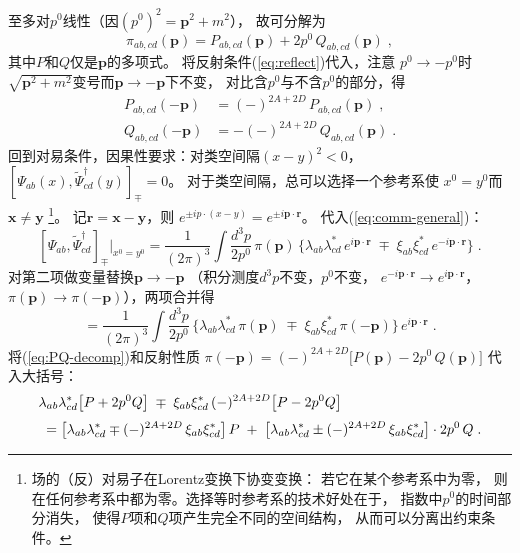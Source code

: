 至多对$p^{0}$线性（因$(p^{0})^{2}=\boldsymbol{p}^{2}+m^{2}$），
故可分解为
\begin{equation}\label{eq:PQ-decomp}
  \pi_{ab,cd}(\boldsymbol{p})
  = P_{ab,cd}(\boldsymbol{p})
  + 2p^{0}\,Q_{ab,cd}(\boldsymbol{p})\;,
\end{equation}
其中$P$和$Q$仅是$\boldsymbol{p}$的多项式。
将反射条件(\ref{eq:reflect})代入，注意
$p^{0}\to -p^{0}$时
$\sqrt{\boldsymbol{p}^{2}+m^{2}}$变号而$\boldsymbol{p}\to -\boldsymbol{p}$下不变，
对比含$p^{0}$与不含$p^{0}$的部分，得
\begin{align}
  P_{ab,cd}(-\boldsymbol{p})
  &= (-)^{2A+2D}\,P_{ab,cd}(\boldsymbol{p})\;,
  \label{eq:P-reflect}\\[2pt]
  Q_{ab,cd}(-\boldsymbol{p})
  &= -(-)^{2A+2D}\,Q_{ab,cd}(\boldsymbol{p})\;.
  \label{eq:Q-reflect}
\end{align}
回到对易条件，因果性要求：对类空间隔$(x-y)^{2}<0$，
$[\Psi_{ab}(x),\widetilde{\Psi}_{cd}^{\dagger}(y)]_{\mp}=0$。
对于类空间隔，总可以选择一个参考系使
$x^{0}=y^{0}$而$\boldsymbol{x}\neq\boldsymbol{y}$%
\footnote{场的（反）对易子在Lorentz变换下协变变换：
若它在某个参考系中为零，
则在任何参考系中都为零。选择等时参考系的技术好处在于，
指数中$p^{0}$的时间部分消失，
使得$P$项和$Q$项产生完全不同的空间结构，
从而可以分离出约束条件。}。
记$\mathbf{r}=\boldsymbol{x}-\boldsymbol{y}$，则
$e^{\pm ip\cdot(x-y)}=e^{\pm i\boldsymbol{p}\cdot\mathbf{r}}$。
代入(\ref{eq:comm-general})：
\[
  [\Psi_{ab},\widetilde{\Psi}_{cd}^{\dagger}]_{\mp}\Big|_{x^{0}=y^{0}}
  = \frac{1}{(2\pi)^{3}}\int\frac{d^{3}p}{2p^{0}}\,\pi(\boldsymbol{p})\,
    \bigl\{\lambda_{ab}\lambda_{cd}^{*}\,e^{i\boldsymbol{p}\cdot\mathbf{r}}
    \;\mp\; \xi_{ab}\xi_{cd}^{*}\,e^{-i\boldsymbol{p}\cdot\mathbf{r}}\bigr\}\;.
\]
对第二项做变量替换$\boldsymbol{p}\to -\boldsymbol{p}$
（积分测度$d^{3}p$不变，$p^{0}$不变，
$e^{-i\boldsymbol{p}\cdot\mathbf{r}}\to e^{i\boldsymbol{p}\cdot\mathbf{r}}$，
$\pi(\boldsymbol{p})\to \pi(-\boldsymbol{p})$），两项合并得
\[
  = \frac{1}{(2\pi)^{3}}\int\frac{d^{3}p}{2p^{0}}\,
    \bigl\{\lambda_{ab}\lambda_{cd}^{*}\,\pi(\boldsymbol{p})
    \;\mp\; \xi_{ab}\xi_{cd}^{*}\,\pi(-\boldsymbol{p})\bigr\}
    \,e^{i\boldsymbol{p}\cdot\mathbf{r}}\;.
\]
将(\ref{eq:PQ-decomp})和反射性质
$\pi(-\boldsymbol{p})=(-)^{2A+2D}\bigl[P(\boldsymbol{p})-2p^{0}\,Q(\boldsymbol{p})\bigr]$
代入大括号：
\begin{align}
  &\lambda_{ab}\lambda_{cd}^{*}\bigl[P+2p^{0}Q\bigr]
   \;\mp\; \xi_{ab}\xi_{cd}^{*}\,(-)^{2A+2D}
       \bigl[P-2p^{0}Q\bigr] \notag\\[3pt]
  &\;= \bigl[\lambda_{ab}\lambda_{cd}^{*}
         \mp (-)^{2A+2D}\,\xi_{ab}\xi_{cd}^{*}\bigr]\,P
    \;+\; \bigl[\lambda_{ab}\lambda_{cd}^{*}
         \pm (-)^{2A+2D}\,\xi_{ab}\xi_{cd}^{*}\bigr]
           \cdot 2p^{0}\,Q\;.
  \label{eq:PQ-split}
\end{align}

